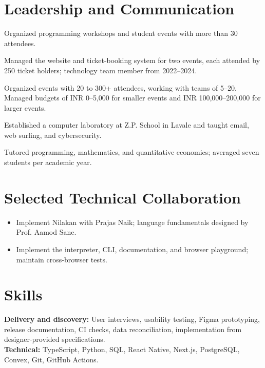 \section{Leadership and Communication}
Organized programming workshops and student events with more than 30 attendees.\par
\vspace{3pt}
Managed the website and ticket-booking system for two events, each attended by 250 ticket holders; technology team member from 2022--2024.\par
\vspace{3pt}
Organized events with 20 to 300+ attendees, working with teams of 5--20. Managed budgets of INR 0--5,000 for smaller events and INR 100,000--200,000 for larger events.\par
\vspace{3pt}
Established a computer laboratory at Z.P. School in Lavale and taught email, web surfing, and cybersecurity.\par
\vspace{3pt}
Tutored programming, mathematics, and quantitative economics; averaged seven students per academic year.
\section{Selected Technical Collaboration}
\begin{itemize}
  \item Implement Nilakan with Prajas Naik; language fundamentals designed by Prof. Aamod Sane.
  \item Implement the interpreter, CLI, documentation, and browser playground; maintain cross-browser tests.
\end{itemize}
\section{Skills}
\textbf{Delivery and discovery:} User interviews, usability testing, Figma prototyping, release documentation, CI checks, data reconciliation, implementation from designer-provided specifications.\\
\textbf{Technical:} TypeScript, Python, SQL, React Native, Next.js, PostgreSQL, Convex, Git, GitHub Actions.

